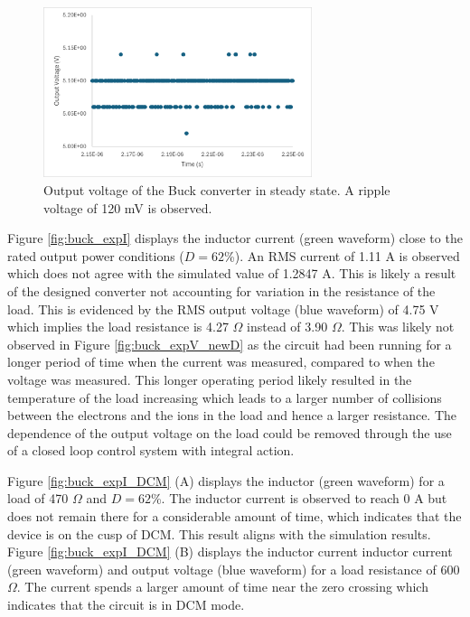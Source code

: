 \documentclass[12pt,twoside]{scrartcl}
\begin{document}
\begin{figure}[h!]
    \centering
    \includegraphics[width=0.7\textwidth]{buck_expV_ripple}
    \caption{Output voltage of the Buck converter in steady state. A ripple voltage of 120 mV is observed.}
    \label{fig:buck_expV_ripple}
\end{figure}

\noindent Figure \ref{fig:buck_expI} displays the inductor current (green waveform) close to the rated output power conditions ($D = 62$\%). An RMS current of 1.11 A is observed which does not agree with the simulated value of 1.2847 A. This is likely a result of the designed converter not accounting for variation in the resistance of the load. This is evidenced by the RMS output voltage (blue waveform) of 4.75 V which implies the load resistance is 4.27 $\Omega$ instead of 3.90 $\Omega$. This was likely not observed in Figure \ref{fig:buck_expV_newD} as the circuit had been running for a longer period of time when the current was measured, compared to when the voltage was measured. This longer operating period likely resulted in the temperature of the load increasing which leads to a larger number of collisions between the electrons and the ions in the load and hence a larger resistance. The dependence of the output voltage on the load could be removed through the use of a closed loop control system with integral action. \par
\vspace{5mm}
\noindent Figure \ref{fig:buck_expI_DCM} (A) displays the inductor (green waveform) for a load of 470 $\Omega$ and $D = 62$\%. The inductor current is observed to reach 0 A but does not remain there for a considerable amount of time, which indicates that the device is on the cusp of DCM. This result aligns with the simulation results. Figure \ref{fig:buck_expI_DCM} (B) displays the inductor current inductor current (green waveform) and output voltage (blue waveform) for a load resistance of 600 $\Omega$. The current spends a larger amount of time near the zero crossing which indicates that the circuit is in DCM mode.
\end{document}
